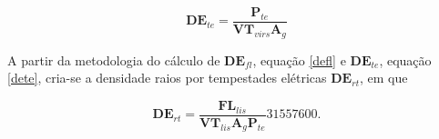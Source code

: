 



\begin{equation}
\mathbf{DE}_{te} = \frac{\mathbf{P}_{te}}{\mathbf{VT}_{virs} \mathbf{A}_g}    
\label{dete}
\end{equation}

A partir da metodologia do cálculo de $\mathbf{DE}_{fl}$, equação \ref{defl} e $\mathbf{DE}_{te}$, equação \ref{dete}, cria-se a densidade raios por tempestades elétricas $\mathbf{DE}_{rt}$, em que 

\begin{equation}
\mathbf{DE}_{rt} = \frac{\mathbf{FL}_{lis}}{\mathbf{VT}_{lis} \mathbf{A}_g\mathbf{P}_{te}} 31557600.  
\label{dert}
\end{equation}



